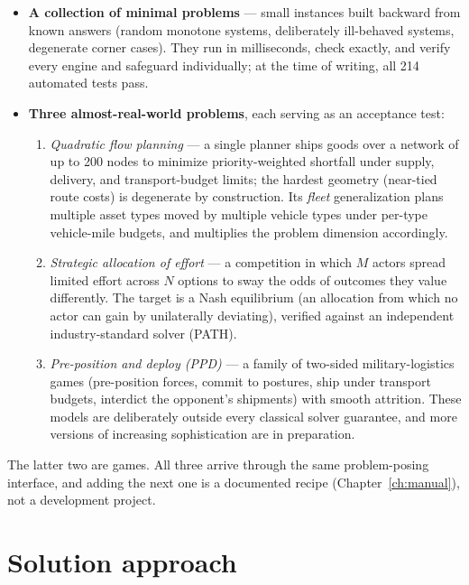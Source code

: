 \begin{itemize}
\item \textbf{A collection of minimal problems} --- small instances built
  backward from known answers (random monotone systems, deliberately
  ill-behaved systems, degenerate corner cases). They run in milliseconds,
  check exactly, and verify every engine and safeguard individually; at
  the time of writing, all 214 automated tests pass.
\item \textbf{Three almost-real-world problems}, each serving as an
  acceptance test:
  \begin{enumerate}
  \item \emph{Quadratic flow planning} --- a single planner ships goods
    over a network of up to 200 nodes to minimize priority-weighted
    shortfall under supply, delivery, and transport-budget limits; the
    hardest geometry (near-tied route costs) is degenerate by
    construction. Its \emph{fleet} generalization plans multiple asset
    types moved by multiple vehicle types under per-type vehicle-mile
    budgets, and multiplies the problem dimension accordingly.
  \item \emph{Strategic allocation of effort} --- a competition in which
    $M$ actors spread limited effort across $N$ options to sway the odds
    of outcomes they value differently. The target is a Nash equilibrium
    (an allocation from which no actor can gain by unilaterally
    deviating), verified against an independent industry-standard solver
    (PATH).
  \item \emph{Pre-position and deploy (PPD)} --- a family of two-sided
    military-logistics games (pre-position forces, commit to postures,
    ship under transport budgets, interdict the opponent's shipments) with
    smooth attrition. These models are deliberately outside every
    classical solver guarantee, and more versions of increasing
    sophistication are in preparation.
  \end{enumerate}
\end{itemize}

The latter two are games. All three arrive through the same problem-posing
interface, and adding the next one is a documented recipe
(Chapter~\ref{ch:manual}), not a development project.

\section{Solution approach}
\label{sec:o-approach}

